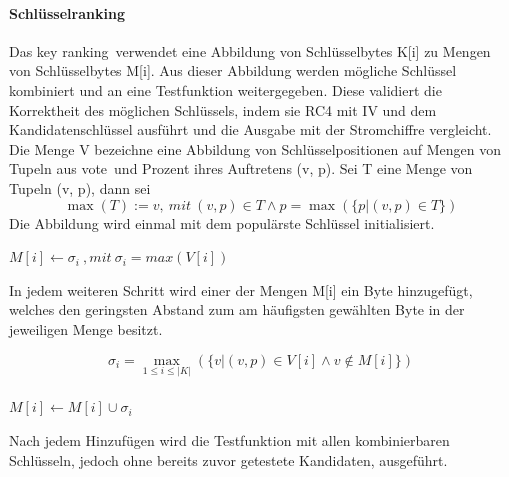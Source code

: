\documentclass[10pt,a4paper]{article}
\begin{document}
\paragraph{Schlüsselranking}
Das \glqq key ranking\grqq\ verwendet eine Abbildung von Schlüsselbytes K[i] zu Mengen von Schlüsselbytes M[i]. Aus dieser Abbildung werden mögliche Schlüssel kombiniert und an eine Testfunktion weitergegeben. Diese validiert die Korrektheit des möglichen Schlüssels, indem sie RC4 mit IV und dem Kandidatenschlüssel ausführt und die Ausgabe mit der Stromchiffre vergleicht.
\vspace{0.5em}
\\Die Menge V bezeichne eine Abbildung von Schlüsselpositionen auf Mengen von Tupeln aus \glqq vote\grqq\ und Prozent ihres Auftretens (v, p). Sei T eine Menge von Tupeln (v, p), dann sei
\[ \max(T) := v,\ mit\ (v, p) \in T \wedge p = \max (\{p | (v,p) \in T \}) \]
Die Abbildung wird einmal mit dem populärste Schlüssel initialisiert.\\
\begin{center}
$ M[i] \leftarrow \sigma_i\ ,mit\ \sigma_i = max(V[i])$
\end{center}
In jedem weiteren Schritt wird einer der Mengen M[i] ein Byte hinzugefügt, welches den geringsten Abstand zum am häufigsten gewählten Byte in der jeweiligen Menge besitzt.
\begin{center}
\[ \sigma_i = \max_{1 \leq i \leq |K|} (\{v | (v,p) \in V[i] \wedge v \notin M[i]\}) \]
\\\vspace{0.8em}
$ M[i] \leftarrow M[i] \cup \sigma_i$
\end{center}
Nach jedem Hinzufügen wird die Testfunktion mit allen kombinierbaren Schlüsseln, jedoch ohne bereits zuvor getestete Kandidaten, ausgeführt. 
\end{document}
